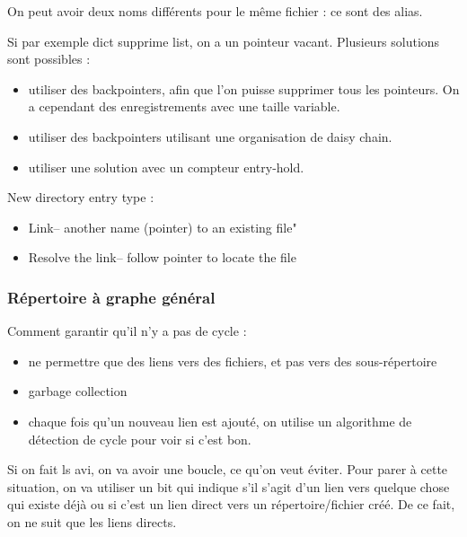 		
		On peut avoir deux noms différents pour le même fichier : ce sont des alias.
		
		Si par exemple dict supprime list, on a un pointeur vacant. Plusieurs solutions sont possibles :
		
		\begin{itemize}
			\item utiliser des backpointers, afin que l'on puisse supprimer tous les pointeurs. On a cependant des enregistrements avec une taille variable.
			\item utiliser des backpointers utilisant une organisation de daisy chain.
			\item utiliser une solution avec un compteur entry-hold.
		\end{itemize}
		
		
		New directory entry type :
		
		\begin{itemize}
			\item Link– another name (pointer) to an existing file"
			\item Resolve the link– follow pointer to locate the file
		\end{itemize}
		
		\subsubsection{Répertoire à graphe général}
		
		
		Comment garantir qu'il n'y a pas de cycle :
		
		\begin{itemize}
			\item ne permettre que des liens vers des fichiers, et pas vers des sous-répertoire
			\item garbage collection
			\item chaque fois qu'un nouveau lien est ajouté, on utilise un algorithme de détection de cycle pour voir si c'est bon.
		\end{itemize}
		
		Si on fait ls avi, on va avoir une boucle, ce qu'on veut éviter. Pour parer à cette situation, on va utiliser un bit qui indique s'il s'agit d'un lien vers quelque chose qui existe déjà ou si c'est un lien direct vers un répertoire/fichier créé. De ce fait, on ne suit que les liens directs.
	
